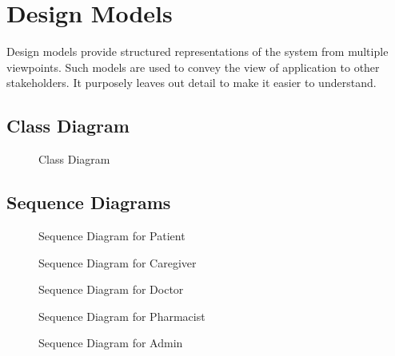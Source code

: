 \documentclass[12pt, a4paper, oneside]{report}
\begin{document}
\section{Design Models}

Design models provide structured representations of the system from multiple viewpoints. Such models are used to convey the view of application to other stakeholders. It purposely leaves out detail to make it easier to understand.

\subsection{Class Diagram}

\begin{figure}[H]
\centering
\caption{Class Diagram}
\label{fig:class-diagram}
\end{figure}

\subsection{Sequence Diagrams}

\begin{figure}[H]
\centering
\caption{Sequence Diagram for Patient}
\label{fig:seq-patient}
\end{figure}

\begin{figure}[H]
\centering
\caption{Sequence Diagram for Caregiver}
\label{fig:seq-caregiver}
\end{figure}

\begin{figure}[H]
\centering
\caption{Sequence Diagram for Doctor}
\label{fig:seq-doctor}
\end{figure}

\begin{figure}[H]
\centering
\caption{Sequence Diagram for Pharmacist}
\label{fig:seq-pharmacist}
\end{figure}

\begin{figure}[H]
\centering
\caption{Sequence Diagram for Admin}
\label{fig:seq-admin}
\end{figure}
\end{document}
